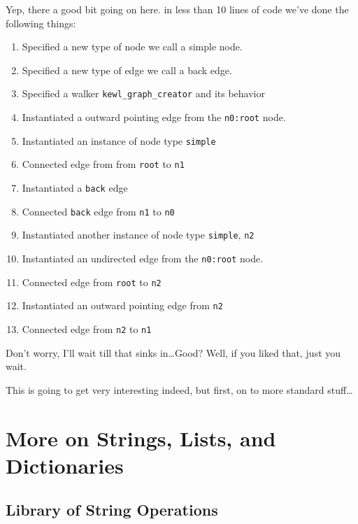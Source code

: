 Yep, there a good bit going on here. in less than 10 lines of code we've done the following things:
\begin{enumerate}[itemsep=0mm]
    \footnotesize
    \item Specified a new type of node we call a simple node.
    \item Specified a new type of edge we call a back edge.
    \item Specified a walker \texttt{kewl\_graph\_creator} and its behavior
    \item Instantiated a outward pointing edge from the \texttt{n0:root} node.
    \item Instantiated an instance of node type \texttt{simple}
    \item Connected edge from from \texttt{root} to \texttt{n1}
    \item Instantiated a \texttt{back} edge
    \item Connected \texttt{back} edge from \texttt{n1} to \texttt{n0}
    \item Instantiated another instance of node type \texttt{simple}, \texttt{n2}
    \item Instantiated an undirected edge from the \texttt{n0:root} node.
    \item Connected edge from \texttt{root} to \texttt{n2}
    \item Instantiated an outward pointing edge from \texttt{n2}
    \item Connected edge from \texttt{n2} to \texttt{n1}
\end{enumerate}

Don't worry, I'll wait till that sinks in\dots Good? Well, if you liked that, just you wait.
\par
This is going to get very interesting indeed, but first,  on to more standard stuff\dots




\section{More on Strings, Lists, and Dictionaries}
\par
{}
\par
{}
\subsection{Library of String Operations}
\printtabStrOps
